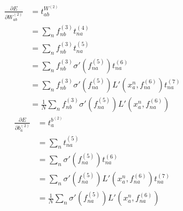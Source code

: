 \documentclass[fleqn]{article}
\begin{document}
\begin{equation}
    \begin{split}
        \frac{\partial E}{\partial W^{(2)}_{ab}} & = t^{W^{(2)}}_{ab} \\
        & = \sum_n f^{(3)}_{nb} t^{(4)}_{na} \\
        & = \sum_n f^{(3)}_{nb} t^{(5)}_{na} \\
        & = \sum_n f^{(3)}_{nb} \sigma'\left(f^{(5)}_{na}\right) t^{(6)}_{na} \\
        & = \sum_n f^{(3)}_{nb} \sigma'\left(f^{(5)}_{na}\right) L'\left(x^n_a, f^{(6)}_{na}\right) t^{(7)}_{na} \\
        & = \frac{1}{N} \sum_n f^{(3)}_{nb} \sigma'\left(f^{(5)}_{na}\right) L'\left(x^n_a, f^{(6)}_{na}\right)
    \end{split}
\end{equation}
\begin{equation}
    \begin{split}
        \frac{\partial E}{\partial b^{(2)}_{a}} & = t^{b^{(2)}}_{a} \\
        & = \sum_n t^{(5)}_{na} \\
        & = \sum_n \sigma'\left(f^{(5)}_{na}\right) t^{(6)}_{na} \\
        & = \sum_n \sigma'\left(f^{(5)}_{na}\right) L'\left(x^n_a, f^{(6)}_{na}\right) t^{(7)}_{na} \\
        & = \frac{1}{N} \sum_n \sigma'\left(f^{(5)}_{na}\right) L'\left(x^n_a, f^{(6)}_{na}\right)
    \end{split}
\end{equation}
\end{document}
